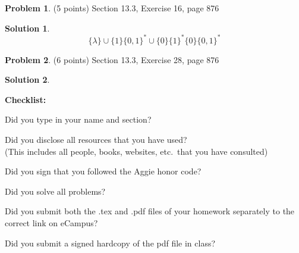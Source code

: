 \documentclass{article}
\theoremstyle{definition}
\newtheorem{problem}{Problem}
\newtheorem*{solution}{Solution}
\newcommand{\checklist}{\noindent\textbf{Checklist:}
\begin{compactitem}[$\Box$] 
\item Did you type in your name and section? 
\item Did you disclose all resources that you have used? \\
(This includes all people, books, websites, etc.\ that you have consulted)
\item Did you sign that you followed the Aggie honor code? 
\item Did you solve all problems? 
\item Did you submit both the .tex and .pdf files of your homework separately 
to the correct link on eCampus?
\item Did you submit a signed hardcopy of the pdf file in class? 
\end{compactitem}
}
\begin{document}
\begin{problem} (5 points)
Section 13.3, Exercise 16, page 876
\end{problem}
\begin{solution} 
$$\{\lambda \} \cup \{1\}\{0,1\}^* \cup \{0\}\{1\}^*\{0\}\{0,1\}^*$$
\end{solution}

\begin{problem} (6 points)
Section 13.3, Exercise 28, page 876
\end{problem}
\begin{solution} 
\end{solution}

\goodbreak
\checklist
\end{document}
